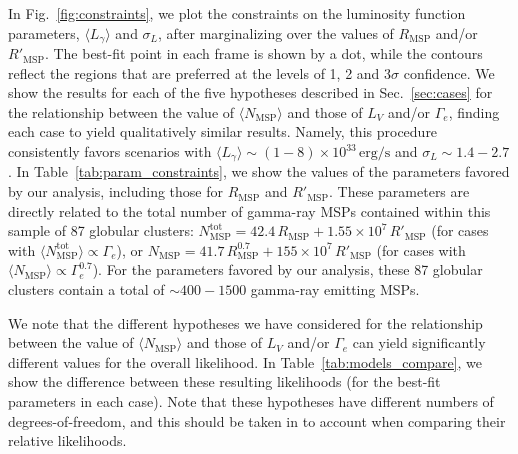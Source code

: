 \documentclass[a4paper,11pt]{article}
\begin{document}
In Fig.~\ref{fig:constraints}, we plot the constraints on the luminosity function parameters, $\langle L_{\gamma} \rangle$ and $\sigma_L$, after marginalizing over the values of $R_\textrm{MSP}$ and/or $R'_\textrm{MSP}$. The best-fit point in each frame is shown by a dot, while the contours reflect the regions that are preferred at the levels of 1, 2 and 3$\sigma$ confidence. We show the results for each of the five hypotheses described in Sec.~\ref{sec:cases} for the relationship between the value of $\langle N_\textrm{MSP}\rangle$ and those of $L_V$ and/or $\Gamma_e$, finding each case to yield qualitatively similar results. Namely, this procedure consistently favors scenarios with $\langle L_{\gamma}\rangle \sim (1-8)\times 10^{33}\, \textrm{erg/s}$ and $\sigma_L \sim 1.4-2.7$. In Table~\ref{tab:param_constraints}, we show the values of the parameters favored by our analysis, including those for $R_\textrm{MSP}$ and $R'_\textrm{MSP}$. These parameters are directly related to the total number of gamma-ray MSPs contained within this sample of 87 globular clusters:  $N^\textrm{tot}_\textrm{MSP}=42.4 \, R_\textrm{MSP} + 1.55 \times 10^7 \, R'_\textrm{MSP}$ (for cases with $\langle N^\textrm{tot}_\textrm{MSP} \rangle \propto \Gamma_e$), or $N_\textrm{MSP}=41.7 \, R_\textrm{MSP}^{0.7} + 155 \times 10^7 \, R'_\textrm{MSP}$ (for cases with $\langle N_\textrm{MSP} \rangle \propto \Gamma_e^{0.7}$). For the parameters favored by our analysis, these 87 globular clusters contain a total of $\sim 400-1500$ gamma-ray emitting MSPs.

We note that the different hypotheses we have considered for the relationship between the value of $\langle N_\textrm{MSP}\rangle$ and those of $L_V$ and/or $\Gamma_e$ can yield significantly different values for the overall likelihood. In Table~\ref{tab:models_compare}, we show the difference between these resulting likelihoods (for the best-fit parameters in each case). Note that these hypotheses have different numbers of degrees-of-freedom, and this should be taken in to account when comparing their relative likelihoods.
\end{document}
